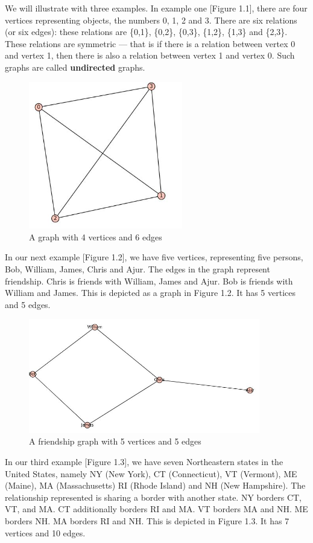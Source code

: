 \documentclass[ebook,12pt,oneside,openany]{memoir}
\begin{document}
We will illustrate with three examples. In example one [Figure 1.1], there are four vertices representing objects, the numbers 0, 1, 2 and 3. There are six relations (or six edges): these relations are \{0,1\}, \{0,2\}, \{0,3\}, \{1,2\}, \{1,3\} and \{2,3\}. These relations are symmetric --- that is if there is a relation between vertex 0 and vertex 1, then there is also a relation between vertex 1 and vertex 0. Such graphs are called \textbf{undirected} graphs.
\begin{figure}
\includegraphics[width=0.6\textwidth]{example.JPG}
\caption{A graph with 4 vertices and 6 edges}
\end{figure}
\begin{newpage}
\end{newpage}

In our next example [Figure 1.2], we have five vertices, representing five persons, Bob, William, James, Chris and Ajur. The edges in the graph represent friendship. Chris is friends with William, James and Ajur. Bob is friends with William and James. This is depicted as a graph in Figure 1.2. It has 5 vertices and 5 edges.
\begin{figure}
\includegraphics[width=0.9\textwidth]{example2.JPG}
\caption{A friendship graph with 5 vertices and 5 edges}
\end{figure}
\begin{newpage}
\end{newpage}
In our third example [Figure 1.3], we have seven Northeastern states in the United States, namely NY (New York), CT (Connecticut), VT (Vermont), ME (Maine), MA (Massachusetts) RI (Rhode Island) and NH (New Hampshire). The relationship represented is sharing a border with another state. NY borders CT, VT, and MA. CT additionally borders RI and MA. VT borders MA and NH. ME borders NH. MA borders RI and NH. This is depicted in Figure 1.3. It has 7 vertices and 10 edges.
\end{document}
